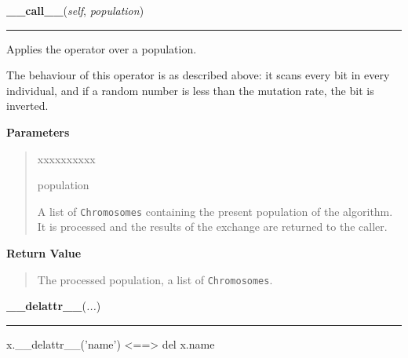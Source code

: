     \begin{boxedminipage}{\textwidth}

    \raggedright \textbf{\_\_call\_\_}(\textit{self}, \textit{population})

    \vspace{-1.5ex}

    \rule{\textwidth}{0.5\fboxrule}

Applies the operator over a population.

The behaviour of this operator is as described above: it scans every bit
in every individual, and if a random number is less than the mutation
rate, the bit is inverted.
    \vspace{1ex}

      \textbf{Parameters}
      \begin{quote}
        \begin{Ventry}{xxxxxxxxxx}

          \item[population]


A list of \texttt{Chromosomes} containing the present population of the
algorithm. It is processed and the results of the exchange are
returned to the caller.
        \end{Ventry}

      \end{quote}

    \vspace{1ex}

      \textbf{Return Value}
      \begin{quote}

The processed population, a list of \texttt{Chromosomes}.
      \end{quote}

    \vspace{1ex}

    \end{boxedminipage}

    \label{object:__delattr__}

    \vspace{0.5ex}

    \begin{boxedminipage}{\textwidth}

    \raggedright \textbf{\_\_delattr\_\_}(\textit{...})

    \vspace{-1.5ex}

    \rule{\textwidth}{0.5\fboxrule}

x.{\_}{\_}delattr{\_}{\_}('name') {\textless}=={\textgreater} del x.name
    \vspace{1ex}

    \end{boxedminipage}

